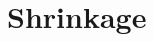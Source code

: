 \documentclass[8pt]{beamer}
\begin{document}

    \section{Shrinkage}

    \def\codewidth{5.2cm}
\end{document}
